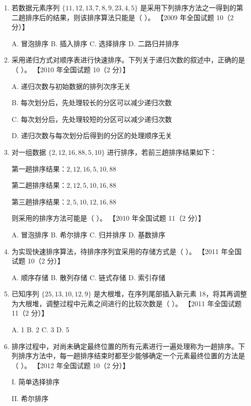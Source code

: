 \documentclass[lang=cn,newtx,10pt,scheme=chinese]{elegantbook}
\begin{document}
\begin{enumerate}
    \item 若数据元素序列 $\{11, 12, 13, 7, 8, 9, 23, 4, 5\}$ 是采用下列排序方法之一得到的第二趟排序后的结果，则该排序算法只能是（ ）。  
    【2009 年全国试题 10（2 分）】  

    A. 冒泡排序 \quad B. 插入排序 \quad C. 选择排序 \quad D. 二路归并排序  

    \item 采用递归方式对顺序表进行快速排序。下列关于递归次数的叙述中，正确的是（ ）。  
    【2010 年全国试题 10（2 分）】  

    A. 递归次数与初始数据的排列次序无关  

    B. 每次划分后，先处理较长的分区可以减少递归次数  

    C. 每次划分后，先处理较短的分区可以减少递归次数  
    
    D. 递归次数与每次划分后得到的分区的处理顺序无关  

    \item 对一组数据 $\{2, 12, 16, 88, 5, 10\}$ 进行排序，若前三趟排序结果如下：  
    
    第一趟排序结果：$2, 12, 16, 5, 10, 88$  
    
    第二趟排序结果：$2, 12, 5, 10, 16, 88$  
    
    第三趟排序结果：$2, 5, 10, 12, 16, 88$  
   
    则采用的排序方法可能是（ ）。  
    【2010 年全国试题 11（2 分）】  

    A. 冒泡排序 \quad B. 希尔排序 \quad C. 归并排序 \quad D. 基数排序  

    \item 为实现快速排序算法，待排序序列宜采用的存储方式是（ ）。  
    【2011 年全国试题 10（2 分）】  

    A. 顺序存储 \quad B. 散列存储 \quad C. 链式存储 \quad D. 索引存储  

    \item 已知序列 $\{25, 13, 10, 12, 9\}$ 是大根堆，在序列尾部插入新元素 18，将其再调整为大根堆，调整过程中元素之间进行的比较次数是（ ）。  
    【2011 年全国试题 11（2 分）】  

    A. 1 \quad B. 2 \quad C. 3 \quad D. 5  

    \item 排序过程中，对尚未确定最终位置的所有元素进行一遍处理称为一趟排序。下列排序方法中，每一趟排序结束时都至少能够确定一个元素最终位置的方法是（ ）。  
    【2012 年全国试题 10（2 分）】  

    I. 简单选择排序  

    II. 希尔排序  


\end{enumerate}
\end{document}
